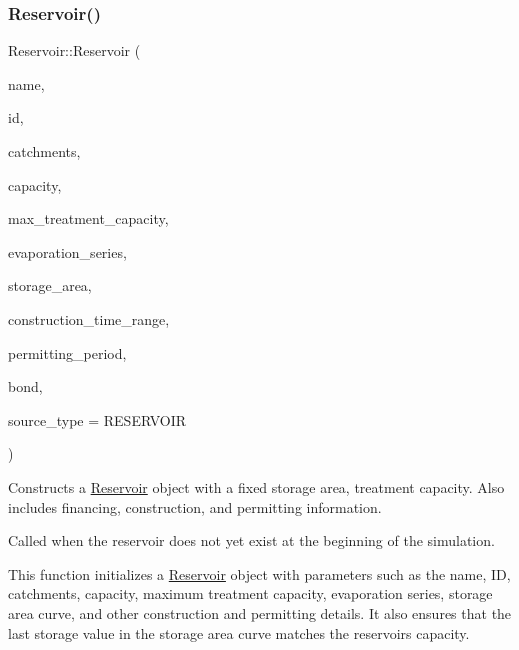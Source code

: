 \subsubsection{\texorpdfstring{Reservoir()}{Reservoir()}\hspace{0.1cm}{\footnotesize\ttfamily [4/9]}}
{\footnotesize\ttfamily Reservoir\+::\+Reservoir (\begin{DoxyParamCaption}\item[{const char $\ast$}]{name,  }\item[{const int}]{id,  }\item[{const vector$<$ \mbox{\hyperlink{classCatchment}{Catchment}} $\ast$$>$ \&}]{catchments,  }\item[{const double}]{capacity,  }\item[{const double}]{max\+\_\+treatment\+\_\+capacity,  }\item[{Evaporation\+Series \&}]{evaporation\+\_\+series,  }\item[{double}]{storage\+\_\+area,  }\item[{const vector$<$ double $>$ \&}]{construction\+\_\+time\+\_\+range,  }\item[{double}]{permitting\+\_\+period,  }\item[{\mbox{\hyperlink{classBond}{Bond}} \&}]{bond,  }\item[{int}]{source\+\_\+type = {\ttfamily RESERVOIR} }\end{DoxyParamCaption})}



Constructs a \mbox{\hyperlink{classReservoir}{Reservoir}} object with a fixed storage area, treatment capacity. Also includes financing, construction, and permitting information. 

Called when the reservoir does not yet exist at the beginning of the simulation.

This function initializes a \mbox{\hyperlink{classReservoir}{Reservoir}} object with parameters such as the name, ID, catchments, capacity, maximum treatment capacity, evaporation series, storage area curve, and other construction and permitting details. It also ensures that the last storage value in the storage area curve matches the reservoir\textquotesingle{}s capacity.


